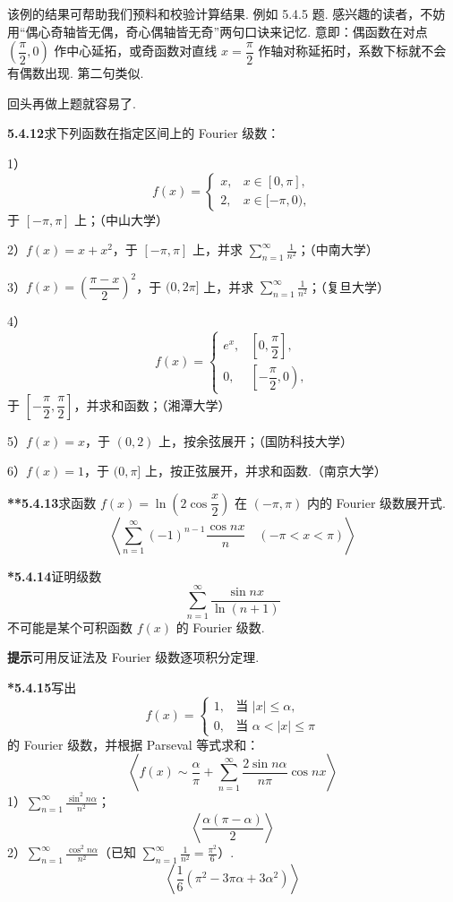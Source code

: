 \documentclass[UTF8,12pt,a4paper,fontset=fandol]{ctexart}
\begin{document}
该例的结果可帮助我们预料和校验计算结果. 例如 5.4.5 题.
感兴趣的读者，不妨用“偶心奇轴皆无偶，奇心偶轴皆无奇”两句口诀来记忆. 意即：偶函数在对点
$\left(\dfrac{\pi}{2},0\right)$ 作中心延拓，或奇函数对直线 $x=\dfrac{\pi}{2}$ 作轴对称延拓时，系数下标就不会有偶数出现. 第二句类似.

回头再做上题就容易了.

\noindent\textbf{5.4.12}\quad 求下列函数在指定区间上的 Fourier 级数：

1）
\[
  f(x)=
  \begin{cases}
  x,&x\in[0,\pi],\\
  2,&x\in[-\pi,0),
  \end{cases}
\]
于 $[-\pi,\pi]$ 上；（中山大学）

2）$f(x)=x+x^2$，于 $[-\pi,\pi]$ 上，并求
$\displaystyle\sum_{n=1}^{\infty}\frac1{n^2}$；（中南大学）

3）$f(x)=\left(\dfrac{\pi-x}{2}\right)^2$，于 $(0,2\pi]$ 上，并求
$\displaystyle\sum_{n=1}^{\infty}\frac1{n^2}$；（复旦大学）

4）
\[
  f(x)=
  \begin{cases}
  e^x,&\left[0,\dfrac{\pi}{2}\right],\\
  0,&\left[-\dfrac{\pi}{2},0\right),
  \end{cases}
\]
于 $\left[-\dfrac{\pi}{2},\dfrac{\pi}{2}\right]$，并求和函数；（湘潭大学）

5）$f(x)=x$，于 $(0,2)$ 上，按余弦展开；（国防科技大学）

6）$f(x)=1$，于 $(0,\pi]$ 上，按正弦展开，并求和函数.（南京大学）

\noindent\textbf{**5.4.13}\quad 求函数
$f(x)=\ln\left(2\cos\dfrac{x}{2}\right)$ 在 $(-\pi,\pi)$ 内的 Fourier 级数展开式.
\[
  \left\langle \sum_{n=1}^{\infty}(-1)^{n-1}\frac{\cos nx}{n}\quad(-\pi<x<\pi)\right\rangle
\]

\noindent\textbf{*5.4.14}\quad 证明级数
\[
  \sum_{n=1}^{\infty}\frac{\sin nx}{\ln(n+1)}
\]
不可能是某个可积函数 $f(x)$ 的 Fourier 级数.

\noindent\textbf{提示}\quad 可用反证法及 Fourier 级数逐项积分定理.

\noindent\textbf{*5.4.15}\quad 写出
\[
  f(x)=
  \begin{cases}
  1,&\text{当 }|x|\le\alpha,\\
  0,&\text{当 }\alpha<|x|\le\pi
  \end{cases}
\]
的 Fourier 级数，并根据 Parseval 等式求和：
\[
  \left\langle f(x)\sim\frac{\alpha}{\pi}+
  \sum_{n=1}^{\infty}\frac{2\sin n\alpha}{n\pi}\cos nx\right\rangle
\]
1）$\displaystyle\sum_{n=1}^{\infty}\frac{\sin^2n\alpha}{n^2}$；
\[
  \left\langle\frac{\alpha(\pi-\alpha)}{2}\right\rangle
\]
2）$\displaystyle\sum_{n=1}^{\infty}\frac{\cos^2n\alpha}{n^2}$（已知 $\displaystyle\sum_{n=1}^{\infty}\frac1{n^2}=\frac{\pi^2}{6}$）.
\[
  \left\langle\frac16(\pi^2-3\pi\alpha+3\alpha^2)\right\rangle
\]
\end{document}
